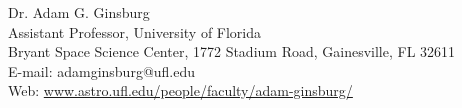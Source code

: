 \begin{center}
{\large Dr. Adam G. Ginsburg}\\
Assistant Professor, University of Florida\\
Bryant Space Science Center,
1772 Stadium Road,
Gainesville, FL 32611\\
E-mail: adamginsburg@ufl.edu \\
Web: \url{www.astro.ufl.edu/people/faculty/adam-ginsburg/} %
\end{center}

